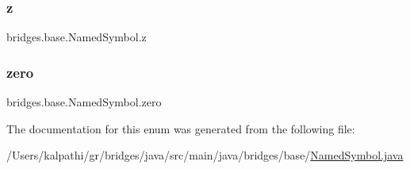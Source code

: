 \mbox{\label{enumbridges_1_1base_1_1_named_symbol_afd675b395e85e5dd4329d7586be20fdf}} 
\subsubsection{\texorpdfstring{z}{z}}
{\footnotesize\ttfamily bridges.\+base.\+Named\+Symbol.\+z}

\mbox{\label{enumbridges_1_1base_1_1_named_symbol_a3db51a591e688df96b707c28a7b03ae4}} 
\subsubsection{\texorpdfstring{zero}{zero}}
{\footnotesize\ttfamily bridges.\+base.\+Named\+Symbol.\+zero}



The documentation for this enum was generated from the following file\+:\begin{DoxyCompactItemize}
\item 
/\+Users/kalpathi/gr/bridges/java/src/main/java/bridges/base/\mbox{\hyperlink{_named_symbol_8java}{Named\+Symbol.\+java}}\end{DoxyCompactItemize}
